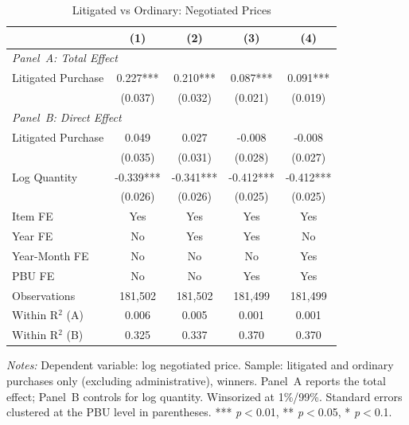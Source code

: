 \begin{table}[ht]
  \centering
  \caption{Litigated vs Ordinary: Negotiated Prices}
  \label{tab:t2_lit_neg_prices}
  \small
  \begin{threeparttable}
  \begin{tabular}{lcccc}
    \hline\hline
    & (1) & (2) & (3) & (4) \\
    \hline
    \multicolumn{5}{l}{\textit{Panel~A: Total Effect}} \\[3pt]
    Litigated Purchase & 0.227*** & 0.210*** & 0.087*** & 0.091*** \\
     & (0.037) & (0.032) & (0.021) & (0.019) \\[3pt]
    \hline
    \multicolumn{5}{l}{\textit{Panel~B: Direct Effect}} \\[3pt]
    Litigated Purchase & 0.049 & 0.027 & -0.008 & -0.008 \\
     & (0.035) & (0.031) & (0.028) & (0.027) \\[3pt]
    Log Quantity & -0.339*** & -0.341*** & -0.412*** & -0.412*** \\
     & (0.026) & (0.026) & (0.025) & (0.025) \\[3pt]
    \hline
    Item FE & Yes & Yes & Yes & Yes \\
    Year FE & No & Yes & Yes & No \\
    Year-Month FE & No & No & No & Yes \\
    PBU FE & No & No & Yes & Yes \\
    Observations & 181,502 & 181,502 & 181,499 & 181,499 \\
    Within R$^2$ (A) & 0.006 & 0.005 & 0.001 & 0.001 \\
    Within R$^2$ (B) & 0.325 & 0.337 & 0.370 & 0.370 \\
    \hline\hline
  \end{tabular}
  \begin{tablenotes}
    \small
    \item \textit{Notes:} Dependent variable: log negotiated price. Sample: litigated and ordinary purchases only (excluding administrative), winners. Panel~A reports the total effect; Panel~B controls for log quantity. Winsorized at 1\%/99\%. Standard errors clustered at the PBU level in parentheses. *** \textit{p}$<$0.01, ** \textit{p}$<$0.05, * \textit{p}$<$0.1.
  \end{tablenotes}
  \end{threeparttable}
\end{table}
